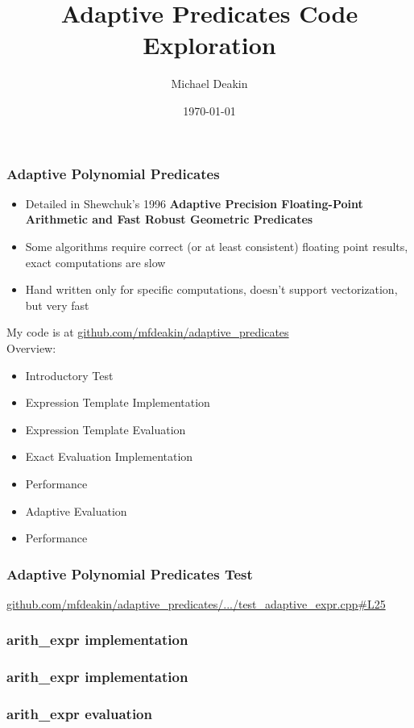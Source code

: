 \documentclass{beamer}
\title{Adaptive Predicates Code Exploration}
\author{Michael Deakin}
\date{\today}
\begin{document}
\begin{frame}
  \titlepage
\end{frame}

\begin{frame}[fragile]
  \frametitle{Adaptive Polynomial Predicates}
  \begin{itemize}
  \item Detailed in Shewchuk's 1996 {\bf Adaptive Precision Floating-Point Arithmetic and Fast Robust Geometric Predicates}
  \item Some algorithms require correct (or at least consistent) floating point results, exact computations are slow
  \item Hand written only for specific computations, doesn't support vectorization, but very fast
  \end{itemize}
  My code is at \href{https://github.com/mfdeakin/adaptive_predicates}{github.com/mfdeakin/adaptive\_predicates}\\
  Overview:
  \begin{itemize}
  \item Introductory Test
  \item Expression Template Implementation
  \item Expression Template Evaluation
  \item Exact Evaluation Implementation
  \item Performance
  \item Adaptive Evaluation
  \item Performance
  \end{itemize}
\end{frame}

\begin{frame}[fragile]
  \frametitle{Adaptive Polynomial Predicates Test}
  {\href{https://github.com/mfdeakin/adaptive_predicates/blob/main/tests/test_adaptive_expr.cpp#L25}{github.com/mfdeakin/adaptive\_predicates/.../test\_adaptive\_expr.cpp\#L25}}
  
\end{frame}

\begin{frame}[fragile]
  \frametitle{arith\_expr implementation}
  
\end{frame}

\begin{frame}[fragile]
  \frametitle{arith\_expr implementation}
  
\end{frame}

\begin{frame}[fragile]
  \frametitle{arith\_expr evaluation}
  
\end{frame}
\end{document}
